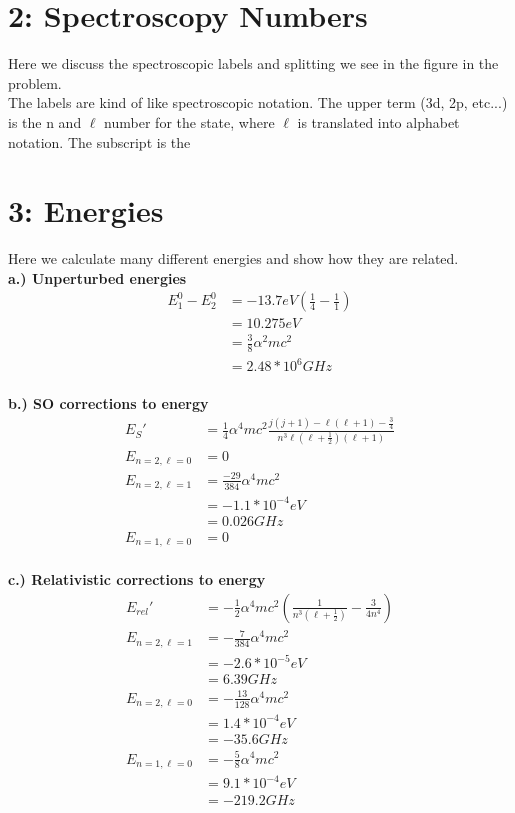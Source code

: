 \documentclass[10pt]{article} %
\begin{document}
\section{2: Spectroscopy Numbers}
Here we discuss the spectroscopic labels and splitting we see in the figure in the
problem.\\

The labels are kind of like spectroscopic notation. The upper term (3d, 2p, etc...) is
the n and $\ell$ number for the state, where $\ell$ is translated into alphabet
notation. The subscript is the 

\section{3: Energies}
Here we calculate many different energies and show how they are related.\\

\textbf{a.) Unperturbed energies}
\begin{align*}
  E_1^0 - E_2^0 &= -13.7eV\left(\frac{1}{4} - \frac{1}{1}\right)\\
  &= 10.275eV\\
  &= \frac{3}{8}\alpha^2mc^2\\
  &= 2.48 * 10^6 GHz\\
\end{align*}

\textbf{b.) SO corrections to energy}
\begin{align*}
  E_{S}' &= \frac{1}{4}\alpha^4mc^2\frac{j(j+1)
    - \ell(\ell+1) - \frac{3}{4}}{n^3\ell(\ell+\frac{1}{2})(\ell+1)}\\
  E_{n=2,\ell=0} &= 0\\
  E_{n=2,\ell=1} &= \frac{-29}{384}\alpha^4mc^2\\
  &= -1.1 *10^{-4} eV\\
  &= 0.026 GHz\\
  E_{n=1,\ell=0} &= 0\\
\end{align*}

\textbf{c.) Relativistic corrections to energy}
\begin{align*}
  E_{rel}' &= -\frac{1}{2}\alpha^4mc^2
  \left(\frac{1}{n^3(\ell+\frac{1}{2})} - \frac{3}{4n^4}\right)\\
  E_{n=2,\ell=1} &= -\frac{7}{384}\alpha^4mc^2\\
  &= -2.6*10^{-5} eV\\
  &= 6.39 GHz\\
  E_{n=2,\ell=0} &= -\frac{13}{128}\alpha^4mc^2\\
  &= 1.4*10^{-4} eV\\
  &= -35.6 GHz\\
  E_{n=1,\ell=0} &= -\frac{5}{8}\alpha^4mc^2\\
  &= 9.1*10^{-4} eV\\
  &= -219.2 GHz\\
\end{align*}
\end{document}
